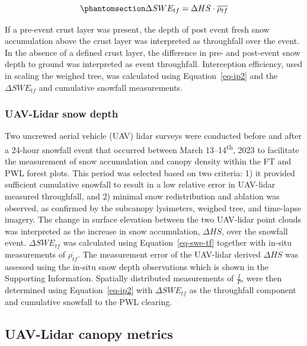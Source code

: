 \documentclass[
  letterpaper,
  DIV=11,
  numbers=noendperiod]{scrartcl}
\begin{document}
\begin{equation}\phantomsection\label{eq-swe-tf}{
\Delta SWE_{tf} = \Delta HS \cdot \overline{\rho_{tf}}
}\end{equation}

If a pre-event crust layer was present, the depth of post event fresh
snow accumulation above the crust layer was interpreted as throughfall
over the event. In the absence of a defined crust layer, the difference
in pre- and post-event snow depth to ground was interpreted as event
throughfall. Interception efficiency, used in scaling the weighed tree,
was calculated using Equation~\ref{eq-ip2} and the \(\Delta SWE_{tf}\)
and cumulative snowfall measurements.

\subsubsection{UAV-Lidar snow depth}\label{uav-lidar-snow-depth}

Two uncrewed aerial vehicle (UAV) lidar surveys were conducted before
and after a 24-hour snowfall event that occurred between March
13--14\textsuperscript{th}, 2023 to facilitate the measurement of snow
accumulation and canopy density within the FT and PWL forest plots. This
period was selected based on two criteria: 1) it provided sufficient
cumulative snowfall to result in a low relative error in UAV-lidar
measured throughfall, and 2) minimal snow redistribution and ablation
was observed, as confirmed by the subcanopy lysimeters, weighed tree,
and time-lapse imagery. The change in surface elevation between the two
UAV-lidar point clouds was interpreted as the increase in snow
accumulation, \(\Delta HS\), over the snowfall event.
\(\Delta SWE_{tf}\) was calculated using Equation~\ref{eq-swe-tf}
together with in-situ measurements of \(\overline{\rho_{tf}}\). The
measurement error of the UAV-lidar derived \(\Delta HS\) was assessed
using the in-situ snow depth observations which is shown in the
Supporting Information. Spatially distributed measurements of
\(\frac{I}{P}\), were then determined using Equation~\ref{eq-ip2} with
\(\Delta SWE_{tf}\) as the throughfall component and cumulative snowfall
to the PWL clearing.

\subsection{UAV-Lidar canopy metrics}\label{uav-lidar-canopy-metrics}
\end{document}
